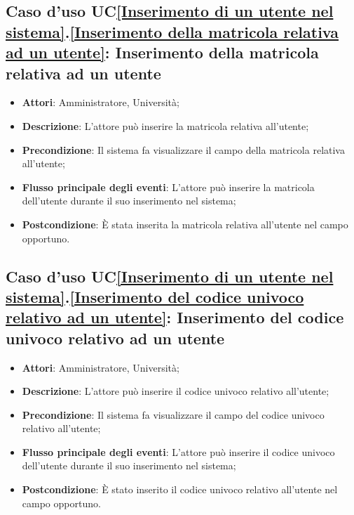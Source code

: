 \subsection{Caso d'uso UC\ref{Inserimento di un utente nel sistema}.\ref{Inserimento della matricola relativa ad un utente}: Inserimento della matricola relativa ad un utente}
\begin{itemize}
	\item \textbf{Attori}: Amministratore, Università;
	\item \textbf{Descrizione}: L'attore può inserire la matricola relativa all'utente;
	\item \textbf{Precondizione}: Il sistema fa visualizzare il campo della matricola relativa all'utente;
	\item \textbf{Flusso principale degli eventi}: L'attore può inserire la matricola dell'utente durante il suo inserimento nel sistema;
	\item \textbf{Postcondizione}: È stata inserita la matricola relativa all'utente nel campo opportuno.
\end{itemize}

\subsection{Caso d'uso UC\ref{Inserimento di un utente nel sistema}.\ref{Inserimento del codice univoco relativo ad un utente}: Inserimento del codice univoco relativo ad un utente}
\begin{itemize}
	\item \textbf{Attori}: Amministratore, Università;
	\item \textbf{Descrizione}: L'attore può inserire il codice univoco relativo all'utente;
	\item \textbf{Precondizione}: Il sistema fa visualizzare il campo del codice univoco relativo all'utente;
	
	\item \textbf{Flusso principale degli eventi}: L'attore può inserire il codice univoco dell'utente durante il suo inserimento nel sistema;
	\item \textbf{Postcondizione}: È stato inserito il codice univoco relativo all'utente nel campo opportuno.
	
\end{itemize}

